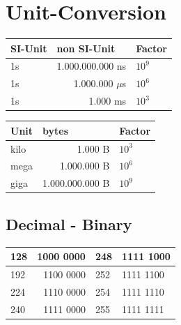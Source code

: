 \documentclass{article}
\begin{document}
\section{Unit-Conversion}
\begin{minipage}{0.49\linewidth}
	\begin{tabular}{|l|r|l|}
		\hline
		\textbf{SI-Unit} & \multicolumn{1}{l|}{\textbf{non SI-Unit}} & \textbf{Factor} \\ \hline
		1s               & 1.000.000.000 ns                          & $ 10^{9} $      \\ \hline
		1s               & 1.000.000 $ \mu $s                                  & $ 10^{6} $      \\ \hline
		1s               & 1.000 ms                                  & $ 10^{3} $      \\ \hline
	\end{tabular}
\end{minipage}
\begin{minipage}{0.49\linewidth}
	\begin{tabular}{|l|r|l|}
		\hline
		\textbf{Unit} & \multicolumn{1}{l|}{\textbf{bytes}} & \textbf{Factor} \\ \hline
		kilo               & 1.000 B                         & $ 10^{3} $      \\ \hline
		mega               & 1.000.000 B                     & $ 10^{6} $      \\ \hline
		giga               & 1.000.000.000 B                 & $ 10^{9} $      \\ \hline
	\end{tabular}
\end{minipage}

\subsection{Decimal - Binary}

\begin{table}[!h]
	\centering
	\begin{tabular}{|l|r|l|l|}
		\hline
		128 & \multicolumn{1}{l|}{1000 0000} & 248 & 1111 1000 \\ \hline
		192 & 1100 0000                      & 252 & 1111 1100 \\ \hline
		224 & 1110 0000                      & 254 & 1111 1110 \\ \hline
		240 & 1111 0000                      & 255 & 1111 1111 \\ \hline
	\end{tabular}
\end{table}
\end{document}
